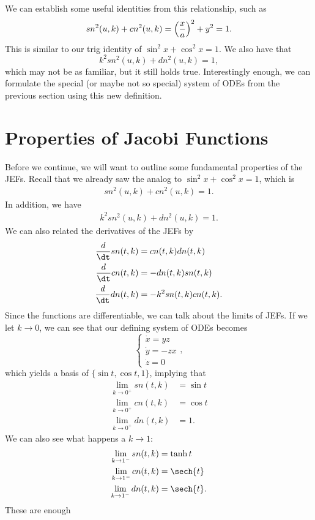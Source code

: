 \documentclass[notitlepage]{hw}
\begin{document}
\vspace{0.5cm}

We can establish some useful identities from this relationship, such as
\[
sn^{2}(u,k)+cn^{2}(u,k)=\left({x\over a}\right)^{2}+y^{2} = 1.
\]
This is similar to our trig identity of $\sin^{2}{x}+\cos^{2}{x}=1$. We also have that
\[
k^{2}sn^{2}(u,k)+dn^{2}(u,k)=1,
\]
which may not be as familiar, but it still holds true. Interestingly enough, we can formulate the
special (or maybe not so special) system of ODEs from the previous section using this new definition.

\section{Properties of Jacobi Functions}

Before we continue, we will want to outline some fundamental properties of the JEFs. Recall that we
already saw the analog to $\sin^{2}{x} + \cos^{2}{x} = 1$, which is
\begin{gather}
sn^{2}(u,k)+cn^{2}(u,k)= 1.
\end{gather}
In addition, we have
\begin{gather}
k^{2}sn^{2}(u,k)+dn^{2}(u,k)=1.
\end{gather}
We can also related the derivatives of the JEFs by
\begin{align}
{d\over\dt}sn(t,k)&=cn(t,k)dn(t,k)\\
{d\over\dt}cn(t,k)&=-dn(t,k)sn(t,k)\\
{d\over\dt}dn(t,k)&=-k^{2}sn(t,k)cn(t,k).
\end{align}
Since the functions are differentiable, we can talk about the limits of JEFs. If we let $k\to0$, we
can see that our defining system of ODEs becomes
\[
\begin{cases}
\dot{x}=yz\\
\dot{y}=-zx\\
\dot{z}=0
\end{cases},
\]
which yields a basis of $\{\sin{t},\cos{t},1\}$, implying that
\begin{align}
\lim_{k\to0^{+}}sn(t,k)&=\sin{t}\\
\lim_{k\to0^{+}}cn(t,k)&=\cos{t}\\
\lim_{k\to0^{+}}dn(t,k)&=1.
\end{align}
We can also see what happens a $k\to1$:
\begin{align}
\lim_{k\to1^{-}}sn(t,k)&=\tanh{t}\\
\lim_{k\to1^{-}}cn(t,k)&=\sech{t}\\
\lim_{k\to1^{-}}dn(t,k)&=\sech{t}.
\end{align}
These are enough
\end{document}
